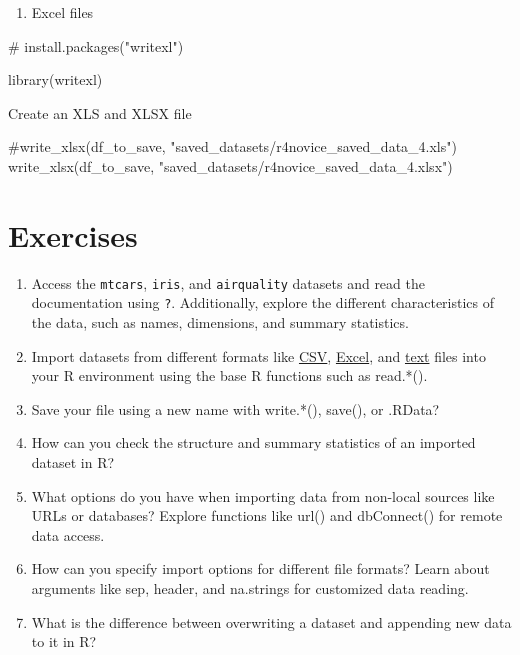 \documentclass[
  letterpaper,
  DIV=11,
  numbers=noendperiod]{scrreprt}
\newenvironment{Shaded}{}{}
\newcommand{\CommentTok}[1]{\textcolor[rgb]{0.42,0.45,0.49}{#1}}
\newcommand{\FunctionTok}[1]{\textcolor[rgb]{0.44,0.26,0.76}{#1}}
\newcommand{\NormalTok}[1]{\textcolor[rgb]{0.14,0.16,0.18}{#1}}
\newcommand{\StringTok}[1]{\textcolor[rgb]{0.01,0.18,0.38}{#1}}
\providecommand{\tightlist}{%
  \setlength{\itemsep}{0pt}\setlength{\parskip}{0pt}}\usepackage{longtable,booktabs,array}
\begin{document}
\begin{enumerate}
\def\labelenumi{\alph{enumi}.}
\setcounter{enumi}{1}
\tightlist
\item
  Excel files
\end{enumerate}

\begin{Shaded}
\begin{Highlighting}[]
\CommentTok{\# install.packages("writexl")}
\end{Highlighting}
\end{Shaded}

\begin{Shaded}
\begin{Highlighting}[]
\FunctionTok{library}\NormalTok{(writexl)}
\end{Highlighting}
\end{Shaded}

Create an XLS and XLSX file

\begin{Shaded}
\begin{Highlighting}[]
\CommentTok{\#write\_xlsx(df\_to\_save, "saved\_datasets/r4novice\_saved\_data\_4.xls")}
\FunctionTok{write\_xlsx}\NormalTok{(df\_to\_save, }\StringTok{"saved\_datasets/r4novice\_saved\_data\_4.xlsx"}\NormalTok{)}
\end{Highlighting}
\end{Shaded}

\section{Exercises}\label{exercises-4}

\begin{enumerate}
\def\labelenumi{\roman{enumi}.}
\item
  Access the \texttt{mtcars}, \texttt{iris}, and \texttt{airquality}
  datasets and read the documentation using \texttt{?}. Additionally,
  explore the different characteristics of the data, such as names,
  dimensions, and summary statistics.
\item
  Import datasets from different formats like \href{}{CSV},
  \href{}{Excel}, and \href{}{text} files into your R environment using
  the base R functions such as read.*().
\item
  Save your file using a new name with write.*(), save(), or .RData?
\item
  How can you check the structure and summary statistics of an imported
  dataset in R?
\item
  What options do you have when importing data from non-local sources
  like URLs or databases? Explore functions like url() and dbConnect()
  for remote data access.
\item
  How can you specify import options for different file formats? Learn
  about arguments like sep, header, and na.strings for customized data
  reading.
\item
  What is the difference between overwriting a dataset and appending new
  data to it in R?
\end{enumerate}
\end{document}
